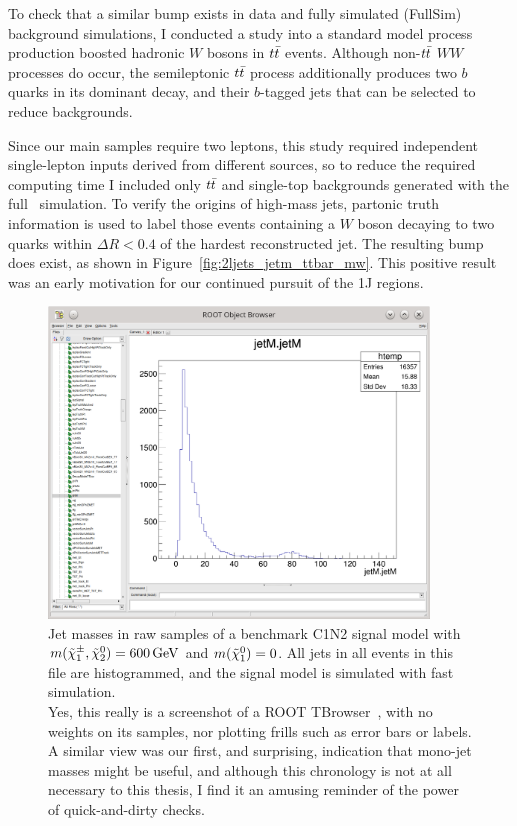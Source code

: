 To check that a similar bump exists in data and fully simulated (FullSim)
background simulations, I conducted a study into a standard model process
production boosted hadronic $W$ bosons in $\ttbar$ events.
Although non-$\ttbar$ $WW$ processes do occur, the semileptonic $\ttbar$
process additionally produces two $b$ quarks in its dominant decay, and their
$b$-tagged jets that can be selected to reduce backgrounds.

Since our main samples require two leptons, this study required independent
single-lepton inputs derived from different sources, so to reduce the required
computing time I included only $\ttbar$ and single-top backgrounds generated
with the full \atlas\ simulation.
To verify the origins of high-mass jets, partonic truth information is used
to label those events containing a $W$ boson decaying to two quarks within
$\Delta R < 0.4$ of the hardest reconstructed jet.
The resulting bump does exist, as shown in
Figure~\ref{fig:2ljets_jetm_ttbar_mw}.
This positive result was an early motivation for our continued pursuit of the
1J regions.

\begin{figure}[tp]
\centering
\includegraphics[width=0.9\textwidth]{figures/2ljets_jetm_c1n2_600_0_tbrowser.png}
\caption[
Jet masses in raw samples of a benchmark C1N2 signal model
]{%
Jet masses in raw samples of a benchmark C1N2 signal model with
$m(\chargino_1,\neutralino_2) = 600\,\eV[G]$ and
$m(\neutralino_1) = 0$.
All jets in all events in this file are histogrammed,
and the signal model is simulated with fast simulation.
\\
Yes, this really is a screenshot of a ROOT TBrowser~\cite{ROOT}, with no
weights on its samples, nor plotting frills such as error bars or labels.
A similar view was our first, and surprising, indication that mono-jet masses
might be useful, and although this chronology is not at all necessary to this
thesis, I find it an amusing reminder of the power of quick-and-dirty checks.
}
\label{fig:2ljets_jetm_c1n2_600_0}
\end{figure}

